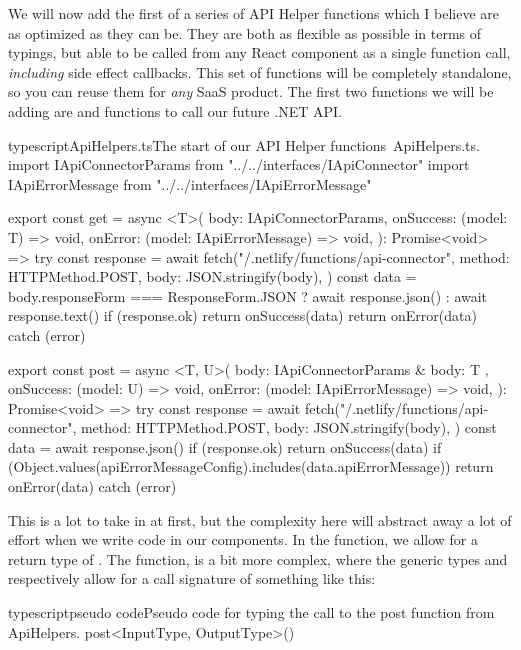 \documentclass[a4paper,headinclude=on,footinclude=on,12pt,oneside]{scrbook}
\begin{document}
We will now add the first of a series of API Helper functions which I believe are as optimized as they can be. They are both as flexible as possible in terms of typings, but able to be called from any React component as a single function call, \textit{including} side effect callbacks. This set of functions will be completely standalone, so you can reuse them for \textit{any} SaaS product. The first two functions we will be adding are  and  functions to call our future .NET API.

\begin{codeInput}{typescript}{ApiHelpers.ts}{The start of our API Helper functions\, ApiHelpers.ts.}
import IApiConnectorParams from "../../interfaces/IApiConnector"
import IApiErrorMessage from "../../interfaces/IApiErrorMessage"

export const get = async <T>(
  body: IApiConnectorParams,
  onSuccess: (model: T) => void,
  onError: (model: IApiErrorMessage) => void,
): Promise<void> => {
  try {
    const response = await fetch("/.netlify/functions/api-connector", {
      method: HTTPMethod.POST,
      body: JSON.stringify(body),
    })
    const data = body.responseForm === ResponseForm.JSON ? await response.json() : await response.text()
    if (response.ok) {
      return onSuccess(data)
    }
    return onError(data)
  } catch (error) {}
}

export const post = async <T, U>(
  body: IApiConnectorParams & { body: T },
  onSuccess: (model: U) => void,
  onError: (model: IApiErrorMessage) => void,
): Promise<void> => {
  try {
    const response = await fetch("/.netlify/functions/api-connector", {
      method: HTTPMethod.POST,
      body: JSON.stringify(body),
    })
    const data = await response.json()
    if (response.ok) {
      return onSuccess(data)
    }
    if (Object.values(apiErrorMessageConfig).includes(data.apiErrorMessage)) {
      return onError(data)
    }
  } catch (error) {}
}  
\end{codeInput}

This is a lot to take in at first, but the complexity here will abstract away a lot of effort when we write code in our components. In the  function, we allow for a return type of . The  function, is a bit more complex, where the generic types  and  respectively allow for a call signature of something like this: 

\begin{codeInput}{typescript}{pseudo code}{Pseudo code for typing the call to the post function from ApiHelpers.}
post<InputType, OutputType>()
\end{codeInput}
\end{document}
